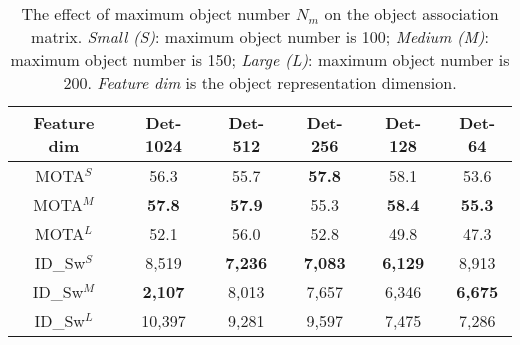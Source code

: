 \documentclass[acmsmall]{acmart}
\begin{document}
\begin{table} 
	\begin{center}
		\setlength{\tabcolsep}{2pt}
		\caption{
		The effect of maximum object number $N_m$ on the object association matrix. 
		\emph{Small (S)}: maximum object number is 100; \emph{Medium (M)}: maximum object number is 150; \emph{Large (L)}: maximum object number is 200.
		\emph{Feature dim} is the object representation dimension. 
		}
		\label{tab:max_obj}
		\centering
		\setlength{\tabcolsep}{3.5pt}
		\begin{tabular}{c|ccccc}
			\hline
			\hline
			Feature dim & Det-1024 & Det-512 & Det-256 & Det-128 & Det-64 \\
			\hline
			MOTA$^S$ & 56.3 & 55.7 & \bf 57.8 & 58.1 & 53.6 \\
			MOTA$^M$ & \bf 57.8 & \bf 57.9 & 55.3 & \bf 58.4 & \bf 55.3 \\
			MOTA$^L$ & 52.1 & 56.0 & 52.8 & 49.8 & 47.3 \\
			\hline
			ID\_Sw$^S$ & 8,519 & \bf 7,236 & \bf 7,083 & \bf 6,129 & 8,913 \\
			ID\_Sw$^M$ & \bf 2,107 & 8,013 & 7,657 &  6,346 & \bf 6,675 \\
			ID\_Sw$^L$ & 10,397 & 9,281 & 9,597 &  7,475 & 7,286 \\
			\hline
			\hline
		\end{tabular}
	\end{center}
\end{table}



\end{document}
